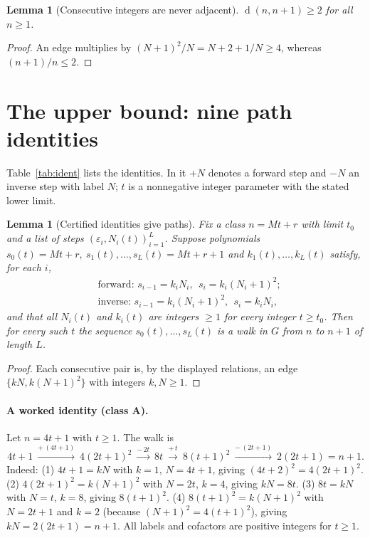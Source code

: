 \documentclass[11pt]{article}
\newtheorem{lemma}[theorem]{Lemma}
\theoremstyle{definition}
\newcommand{\dist}{\operatorname{d}}
\begin{document}
\begin{lemma}[Consecutive integers are never adjacent]\label{lem:nonadj}
$\dist(n,n+1)\ge 2$ for all $n\ge1$.
\end{lemma}
\begin{proof}
An edge multiplies by $(N+1)^2/N=N+2+1/N\ge 4$, whereas $(n+1)/n\le 2$.
\end{proof}

\section{The upper bound: nine path identities}\label{sec:upper}

Table~\ref{tab:ident} lists the identities. In it $+N$ denotes a forward step and $-N$ an inverse step with label
$N$; $t$ is a nonnegative integer parameter with the stated lower limit.

\begin{table}[h]\centering\small

\caption{The nine path identities carrying $n$ to $n+1$. Every integer $n\ge 2$ except $n=3$ lies in exactly one class
(Lemma~\ref{lem:cover}).}\label{tab:ident}
\end{table}

\begin{lemma}[Certified identities give paths]\label{lem:cert}
Fix a class $n=Mt+r$ with limit $t_0$ and a list of steps $(\varepsilon_i,N_i(t))_{i=1}^{L}$. Suppose polynomials
$s_0(t)=Mt+r,\ s_1(t),\dots,s_L(t)=Mt+r+1$ and $k_1(t),\dots,k_L(t)$ satisfy, for each $i$,
\[
\begin{aligned}
&\text{forward: } s_{i-1}=k_iN_i,\ \ s_i=k_i(N_i+1)^2;\\
&\text{inverse: } s_{i-1}=k_i(N_i+1)^2,\ \ s_i=k_iN_i,
\end{aligned}
\]
and that all $N_i(t)$ and $k_i(t)$ are integers $\ge1$ for every integer $t\ge t_0$. Then for every such $t$ the
sequence $s_0(t),\dots,s_L(t)$ is a walk in $G$ from $n$ to $n+1$ of length $L$.
\end{lemma}
\begin{proof}
Each consecutive pair is, by the displayed relations, an edge $\{kN,k(N+1)^2\}$ with integers $k,N\ge1$.
\end{proof}

\paragraph{A worked identity (class A).}
Let $n=4t+1$ with $t\ge1$. The walk is
\[
4t+1\ \xrightarrow{+\,(4t+1)}\ 4(2t+1)^2\ \xrightarrow{-\,2t}\ 8t\ \xrightarrow{+\,t}\ 8(t+1)^2\ \xrightarrow{-\,(2t+1)}\ 2(2t+1)=n+1 .
\]
Indeed: (1) $4t+1=kN$ with $k=1$, $N=4t+1$, giving $(4t+2)^2=4(2t+1)^2$. (2) $4(2t+1)^2=k(N+1)^2$ with $N=2t$, $k=4$, giving
$kN=8t$. (3) $8t=kN$ with $N=t$, $k=8$, giving $8(t+1)^2$. (4) $8(t+1)^2=k(N+1)^2$ with $N=2t+1$ and $k=2$ (because
$(N+1)^2=4(t+1)^2$), giving $kN=2(2t+1)=n+1$. All labels and cofactors are positive integers for $t\ge1$.
\end{document}
